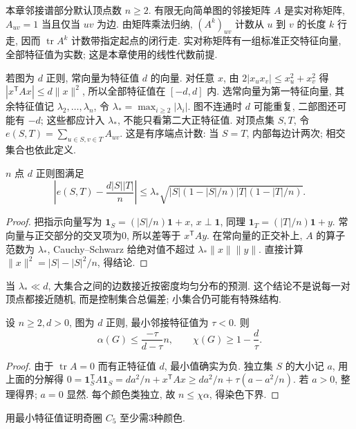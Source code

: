 \label{ch:spectral}
本章邻接谱部分默认顶点数 $n\ge2$. 有限无向简单图的邻接矩阵 $A$ 是实对称矩阵, $A_{uv}=1$ 当且仅当 $uv$ 为边. 由矩阵乘法归纳, $(A^k)_{uv}$ 计数从 $u$ 到 $v$ 的长度 $k$ 行走, 因而 $\operatorname{tr}A^k$ 计数带指定起点的闭行走. 实对称矩阵有一组标准正交特征向量, 全部特征值为实数; 这是本章使用的线性代数前提.

若图为 $d$ 正则, 常向量为特征值 $d$ 的向量. 对任意 $x$, 由 $2|x_ux_v|\le x_u^2+x_v^2$ 得 $|x^{\mathsf T}Ax|\le d\|x\|^2$, 所以全部特征值在 $[-d,d]$ 内. 选常向量为第一特征向量, 其余特征值记 $\lambda_2,\ldots,\lambda_n$, 令 $\lambda_* =\max_{i\ge2}|\lambda_i|$. 图不连通时 $d$ 可能重复, 二部图还可能有 $-d$; 这些都应计入 $\lambda_*$, 不能只看第二大正特征值.
对顶点集 $S,T$, 令 $e(S,T)=\sum_{u\in S,v\in T}A_{uv}$. 这是有序端点计数: 当 $S=T$, 内部每边计两次; 相交集合也依此定义.
\begin{theorem}[扩张混合]\label{thm:mixing}
$n$ 点 $d$ 正则图满足
\[
\left|e(S,T)-\frac{d|S||T|}{n}\right|
\le\lambda_*\sqrt{|S|(1-|S|/n)|T|(1-|T|/n)}.
\]
\end{theorem}
\begin{proof}
把指示向量写为 $\mathbf1_S=(|S|/n)\mathbf1+x$, $x\perp\mathbf1$, 同理 $\mathbf1_T=(|T|/n)\mathbf1+y$. 常向量与正交部分的交叉项为0, 所以差等于 $x^{\mathsf T}Ay$. 在常向量的正交补上, $A$ 的算子范数为 $\lambda_*$, Cauchy--Schwarz 给绝对值不超过 $\lambda_*\|x\|\|y\|$. 直接计算 $\|x\|^2=|S|-|S|^2/n$, 得结论.
\end{proof}
当 $\lambda_*\ll d$, 大集合之间的边数接近按密度均匀分布的预测. 这个结论不是说每一对顶点都接近随机, 而是控制集合总偏差; 小集合仍可能有特殊结构.
\begin{theorem}\label{thm:hoffman}
设 $n\ge2,d>0$, 图为 $d$ 正则, 最小邻接特征值为 $\tau<0$. 则
\[
\alpha(G)\le\frac{-\tau}{d-\tau}n,\qquad \chi(G)\ge1-\frac d\tau.
\]
\end{theorem}
\begin{proof}
由于 $\operatorname{tr}A=0$ 而有正特征值 $d$, 最小值确实为负. 独立集 $S$ 的大小记 $a$, 用上面的分解得 $0=\mathbf1_S^{\mathsf T}A\mathbf1_S=da^2/n+x^{\mathsf T}Ax\ge da^2/n+\tau(a-a^2/n)$. 若 $a>0$, 整理得界; $a=0$ 显然. 每个颜色类独立, 故 $n\le\chi\alpha$, 得染色下界.
\end{proof}
\begin{example}
用最小特征值证明奇圈 $C_5$ 至少需3种颜色.
\end{example}
